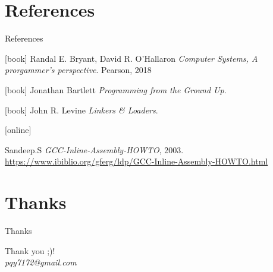 \documentclass[UKenglish]{beamer}
\begin{document}
\section{References}
\begin{frame}[allowframebreaks]{References}
    \begin{thebibliography}{}

        [book]
         Randal E. Bryant, David R. O'Hallaron
        \newblock \emph{Computer Systems, A prorgammer's perspective}.
        \newblock Pearson, 2018
   

      [book]
          Jonathan Bartlett
        \newblock \emph{Programming from the Ground Up}.

        [book]
          John R. Levine
        \newblock \emph{Linkers \& Loaders}.

        
[online]

          Sandeep.S
        \newblock \emph{GCC-Inline-Assembly-HOWTO}, 2003.
        \newblock \url{https://www.ibiblio.org/gferg/ldp/GCC-Inline-Assembly-HOWTO.html}
   \end{thebibliography}
 \end{frame}

 \section{Thanks}

 \begin{frame}{Thanks}
   \begin{center}
     \vspace{2cm}
     \Huge Thank you ;)!\\
     
     \emph{pqy7172@gmail.com}
   \end{center}
 \end{frame}
\end{document}
